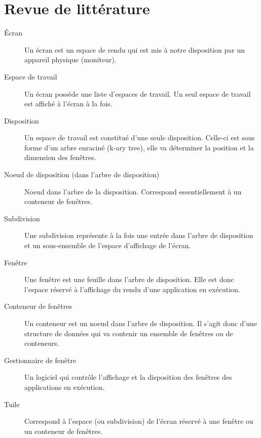 \documentclass[titlepage]{article}
\begin{document}
\section{Revue de littérature}
\begin{description}
    \item [Écran] Un écran est un espace de rendu qui est mis à notre
        disposition par un appareil physique (moniteur).
    \item [Espace de travail] Un écran possède une liste d’espaces de travail.
        Un seul espace de travail est affiché à l’écran à la fois.
    \item [Disposition] Un espace de travail est constitué d’une seule
        disposition. Celle-ci est sous forme d’un arbre enraciné (k-ary tree),
        elle va déterminer la position et la
        dimension des fenêtres.
    \item [Noeud de disposition (dans l’arbre de disposition)] Noeud dans
        l’arbre de la disposition. Correspond essentiellement à un conteneur de
        fenêtres.
    \item [Subdivision] Une subdivision représente à la fois une entrée dans
        l’arbre de disposition et un sous-ensemble de l’espace d’affichage de
        l’écran.
    \item [Fenêtre] Une fenêtre est une feuille dans l’arbre de disposition.
        Elle est donc l’espace réservé à l’affichage du rendu d’une application
        en exécution.
    \item [Conteneur de fenêtres] Un conteneur est un noeud dans l’arbre de
        disposition. Il s’agit donc d’une structure de données qui va contenir
        un ensemble de fenêtres ou de
        conteneurs.
    \item [Gestionnaire de fenêtre] Un logiciel qui contrôle l’affichage et la
        disposition des fenêtres des applications en exécution.
    \item [Tuile] Correspond à l’espace (ou subdivision) de l’écran réservé à
        une fenêtre ou un conteneur de fenêtres.
\end{description}
	
\end{document}
